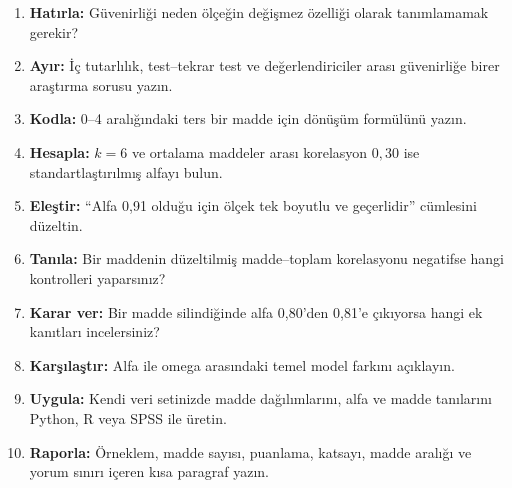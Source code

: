 \begin{enumerate}
\renewcommand{\labelenumi}{\textbf{\Alph{enumi}.}}
  \item \textbf{Hatırla:} Güvenirliği neden ölçeğin değişmez özelliği olarak tanımlamamak gerekir?
  \item \textbf{Ayır:} İç tutarlılık, test--tekrar test ve değerlendiriciler arası güvenirliğe birer araştırma sorusu yazın.
  \item \textbf{Kodla:} 0--4 aralığındaki ters bir madde için dönüşüm formülünü yazın.
  \item \textbf{Hesapla:} $k=6$ ve ortalama maddeler arası korelasyon $0{,}30$ ise standartlaştırılmış alfayı bulun.
  \item \textbf{Eleştir:} ``Alfa 0,91 olduğu için ölçek tek boyutlu ve geçerlidir'' cümlesini düzeltin.
  \item \textbf{Tanıla:} Bir maddenin düzeltilmiş madde--toplam korelasyonu negatifse hangi kontrolleri yaparsınız?
  \item \textbf{Karar ver:} Bir madde silindiğinde alfa 0,80'den 0,81'e çıkıyorsa hangi ek kanıtları incelersiniz?
  \item \textbf{Karşılaştır:} Alfa ile omega arasındaki temel model farkını açıklayın.
  \item \textbf{Uygula:} Kendi veri setinizde madde dağılımlarını, alfa ve madde tanılarını Python, R veya SPSS ile üretin.
  \item \textbf{Raporla:} Örneklem, madde sayısı, puanlama, katsayı, madde aralığı ve yorum sınırı içeren kısa paragraf yazın.
\end{enumerate}

